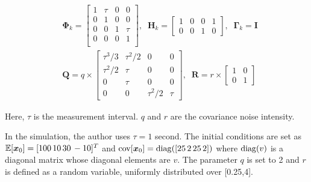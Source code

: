 \begin{align*}
    &\bm{\Phi}_k=
    \begin{bmatrix}
        1 & \tau & 0 & 0\\
        0 & 1 & 0 & 0 \\
        0 & 0 & 1 & \tau \\
        0 & 0 & 0 & 1 \\
    \end{bmatrix}, \;\;
    \bm{H}_k = 
    \begin{bmatrix}
        1&0&0&1\\
        0&0&1&0
    \end{bmatrix}, \;\;
    \bm{\Gamma}_k = \bm{I} \\
    &\bm{Q} = q \times 
    \begin{bmatrix}
        \tau^3/3 & \tau^2/2 & 0 & 0 \\
        \tau^2/2 & \tau & 0 & 0 \\
        0 & \tau & 0 & 0 \\
        0 & 0 & \tau^2/2 & \tau
    \end{bmatrix}, \;\;
    \bm{R}=r\times\begin{bmatrix}
        1&0\\
        0&1
    \end{bmatrix}
\end{align*}

Here, $\tau$ is the measurement interval. $q$ and $r$ are the covariance noise intensity.

In the simulation, the author uses $\tau = 1$ second. The initial conditions are set as $\mathbb{E}[\bm{x}_0]=[100\, 10\, 30\, -10]^T$ and ${\rm cov}[\bm{x}_0]={\rm diag}([25\, 2\, 25\, 2])$ where ${\rm diag}(v)$ is a diagonal matrix whose diagonal elements are $v$.
The parameter $q$ is set to 2 and $r$ is defined as a random variable, uniformly distributed over [0.25,4]. 

